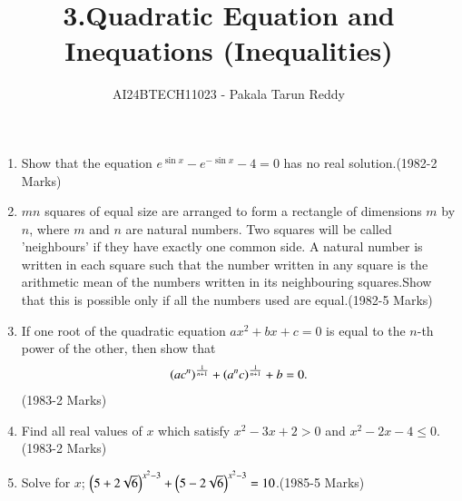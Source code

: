 \documentclass[journal,12pt,twocolumn]{IEEEtran}
\theoremstyle{remark}
\begin{document}

\vspace{3cm}

\title{3.Quadratic Equation and\\ Inequations (Inequalities)}
\author{AI24BTECH11023 - Pakala Tarun Reddy}
\maketitle
\begin{enumerate}[start=13]
\item Show that the equation $e^{\sin{x}}-e^{-\sin{x}}-4=0$ has no real solution.\hfill{(1982-2 Marks)}
\item $mn$ squares of equal size are arranged to form a rectangle of dimensions $m$ by $n$, where $m$ and $n$ are natural numbers. Two squares will be called 'neighbours' if they have exactly one common side. A natural number is written in each square such that the number written in any square is the arithmetic mean of the numbers written in its neighbouring squares.Show that this is possible only if all the numbers used are equal.\hfill{(1982-5 Marks)}
\item {If one root of the quadratic equation $ax^2+bx+c=0$ is equal to the $n$-th power of the other, then show that\begin{align*}
\left(ac^n\right)^\frac{1}{n+1} +\left(a^nc\right)^\frac{1}{n+1}+b=0. \end{align*} \hfill(1983-2 Marks)}
 \item {Find all real values of $x$ which satisfy $x^2-3x+2>0$ and $x^2-2x-4\leq 0$.\hfill{(1983-2 Marks)}}
 \item Solve for $x$; $\left(5+2\sqrt{6}\right)^{x^2-3}+\left(5-2\sqrt{6}\right)^{x^2-3}=10$.\hfill{(1985-5 Marks)}
 

\end{enumerate}
\end{document}
